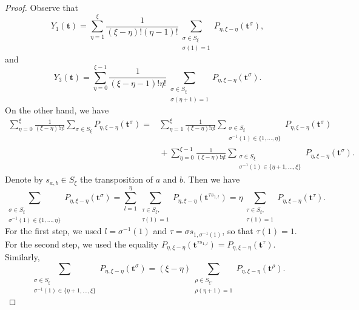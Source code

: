 \documentclass[10pt,a4paper]{amsart}
\numberwithin{equation}{section}
\begin{document}
\begin{proof}
Observe that
\begin{equation*}
Y_1(\boldsymbol{t})= \sum_{\eta=1}^\xi \frac{1}{(\xi-\eta) ! (\eta-1)!} \sum_{\substack{\sigma\in S_\xi\\\sigma (1)=1}} P_{\eta,\xi-\eta}(\boldsymbol{t}^\sigma),
\end{equation*}
and
\begin{equation*}
Y_3(\boldsymbol{t})= \sum_{\eta=0}^{\xi-1} \frac{1}{(\xi-\eta-1) ! \eta !} \sum_{\substack{\sigma\in S_\xi\\\sigma (\eta+1)=1}}P_{\eta,\xi-\eta}(\boldsymbol{t}^\sigma).
\end{equation*}
On the other hand, we have
\begin{align*}
\sum_{\eta=0}^\xi \frac{1}{(\xi-\eta)!\eta!}\sum_{\sigma\in S_\xi} P_{\eta,\xi-\eta}(\boldsymbol{t}^\sigma)={}&\sum_{\eta=1}^\xi \frac{1}{(\xi-\eta)!\eta!} \sum_{\substack{\sigma\in S_\xi\\\sigma^{-1}(1)\in\{1,\dots,\eta\}}} P_{\eta,\xi-\eta}(\boldsymbol{t}^\sigma)\\
&{}{+} \sum_{\eta=0}^{\xi-1} \frac{1}{(\xi-\eta)!\eta!}\sum_{\substack{\sigma\in S_\xi\\\sigma^{-1}(1)\in\{\eta+1,\dots,\xi\}}}P_{\eta,\xi-\eta}(\boldsymbol{t}^\sigma).
\end{align*}
Denote by $s_{a,b}\in S_\xi$ the transposition of $a$ and $b$. Then we have
\begin{equation*}
\sum_{\substack{\sigma\in S_\xi\\\sigma^{-1}(1)\in\{1,\dots,\eta\}}} P_{\eta,\xi-\eta}(\boldsymbol{t}^\sigma) =\sum_{l=1}^\eta \sum_{\substack{\tau\in S_\xi,\\ \tau(1)=1}} P_{\eta,\xi-\eta}(\boldsymbol{t}^{\tau s_{1,l}})= \eta \sum_{\substack{\tau\in S_\xi,\\ \tau(1)=1}} P_{\eta,\xi-\eta}(\boldsymbol{t}^\tau).
\end{equation*}
For the first step, we used $l=\sigma^{-1}(1)$ and $\tau=\sigma s_{1,\sigma^{-1}(1)}$, so that $\tau(1)=1$. For the second step, we used the equality $P_{\eta,\xi-\eta}(\boldsymbol{t}^{\tau s_{1,l}})=P_{\eta,\xi-\eta}(\boldsymbol{t}^\tau)$.
Similarly,
\begin{equation*}
\sum_{\substack{\sigma\in S_\xi\\\sigma^{-1}(1)\in\{\eta+1,\dots,\xi\}}}P_{\eta,\xi-\eta}(\boldsymbol{t}^\sigma)=(\xi-\eta) \sum_{\substack{\rho\in S_\xi,\\ \rho(\eta+1)=1}} P_{\eta,\xi-\eta}(\boldsymbol{t}^\rho).
\end{equation*}

\end{proof}
\end{document}
